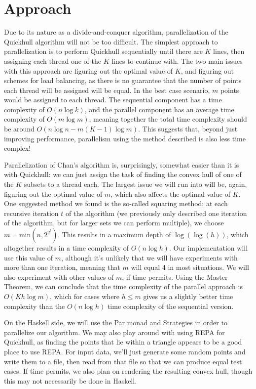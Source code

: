 \documentclass[12pt]{article}
\begin{document}
\section{Approach}


Due to its nature as a divide-and-conquer algorithm, parallelization of the Quickhull algorithm will not be too difficult. The simplest approach to parallelization is to perform Quickhull sequentially until there are $K$ lines, then assigning each thread one of the $K$ lines to continue with. The two main issues with this approach are figuring out the optimal value of $K$, and figuring out schemes for load balancing, as there is no guarantee that the number of points each thread will be assigned will be equal. In the best case scenario, $m$ points would be assigned to each thread. The sequential component has a time complexity of $O(n\log k)$, and the parallel component has an average time complexity of $O(m \log m)$, meaning together the total time complexity should be around $O(n \log n - m(K - 1)\log m)$. This suggests that, beyond just improving performance, parallelism using the method described is also less time complex!

Parallelization of Chan’s algorithm is, surprisingly, somewhat easier than it is with Quickhull: we can just assign the task of finding the convex hull of one of the $K$ subsets to a thread each. The largest issue we will run into will be, again, figuring out the optimal value of $m$, which also affects the optimal value of $K$. One suggested method we found is the so-called squaring method: at each recursive iteration $t$ of the algorithm (we previously only described one iteration of the algorithm, but for larger sets we can perform multiple), we choose $m = \text{min}(n, 2^{2^t})$. This results in a maximum depth of $\log(\log(h))$, which altogether results in a time complexity of $O(n\log h)$. Our implementation will use this value of $m$, although it’s unlikely that we will have experiments with more than one iteration, meaning that $m$ will equal 4 in most situations. We will also experiment with other values of $m$, if time permits. Using the Master Theorem, we can conclude that the time complexity of the parallel approach is $O(Kh\log m)$, which for cases where $h \leq m$ gives us a slightly better time complexity than the $O(n\log h)$ time complexity of the sequential version.

On the Haskell side, we will use the Par monad and Strategies in order to parallelize our algorithm. We may also play around with using REPA for Quickhull, as finding the points that lie within a triangle appears to be a good place to use REPA. For input data, we’ll just generate some random points and write them to a file, then read from that file so that we can produce equal test cases. If time permits, we also plan on rendering the resulting convex hull, though this may not necessarily be done in Haskell.

\nocite{*}
\printbibliography
\end{document}
